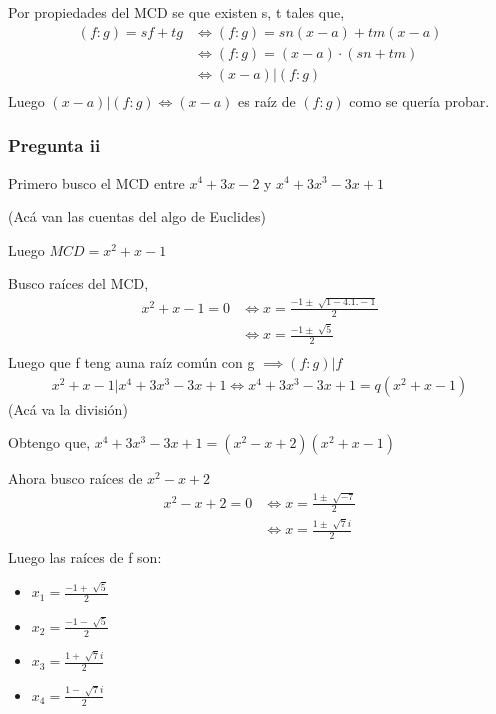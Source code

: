 Por propiedades del MCD se que existen s, t tales que,
\begin{align*}
    (f:g) = sf + tg &\iff (f:g) = sn(x-a) + tm(x-a) \\
    &\iff (f:g) = (x-a) \cdot (sn + tm) \\
    &\iff (x-a)|(f:g) \\
\end{align*}
Luego $ (x-a)|(f:g) \iff (x-a) $ es raíz de $ (f:g) $ como se quería probar.

\subsubsection{Pregunta ii}

Primero busco el MCD entre $ x^4 + 3x - 2 $ y $ x^4 + 3x^3 - 3x + 1 $

(Acá van las cuentas del algo de Euclides)

Luego $ MCD = x^2 + x - 1 $

Busco raíces del MCD,
\begin{align*}
    x^2 + x - 1 = 0 &\iff x = \frac{-1 \pm \sqrt[]{1-4.1.-1}}{2} \\
    &\iff x = \frac{-1 \pm \sqrt[]{5}}{2} \\
\end{align*}
Luego que f teng auna raíz común con g $ \implies (f:g)|f $
\begin{align*}
    x^2 + x - 1 | x^4 + 3x^3 - 3x + 1 \iff x^4 + 3x^3 - 3x + 1 = q(x^2 + x - 1)
\end{align*}
(Acá va la división)

Obtengo que, $ x^4 + 3x^3 - 3x + 1 = (x^2 - x + 2)(x^2 + x - 1) $

Ahora busco raíces de $ x^2 - x + 2 $
\begin{align*}
    x^2 - x + 2 = 0 &\iff x = \frac{1 \pm \sqrt[]{-7}}{2} \\
    &\iff x = \frac{1 \pm \sqrt[]{7}i}{2} \\
\end{align*}
Luego las raíces de f son:
\begin{itemize}
    \item $ x_1 = \frac{-1 + \sqrt[]{5}}{2} $
    \item $ x_2 = \frac{-1 - \sqrt[]{5}}{2} $
    \item $ x_3 = \frac{1 + \sqrt[]{7}i}{2} $
    \item $ x_4 = \frac{1 - \sqrt[]{7}i}{2} $
\end{itemize}

